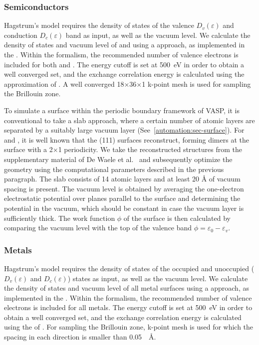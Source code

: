 \begin{refsection}
\subsubsection{Semiconductors} \label{appendix:sec-semiconductors} 

Hagstrum's model requires the density of states of the valence 
$D_v(\varepsilon)$ and conduction $D_c(\varepsilon)$ band as input, as well as 
the vacuum level. We calculate the density of states and vacuum level of 
 and  using a  approach, as implemented in 
the . Within the  formalism, the recommended number of 
valence electrons is included for both  and . The energy cutoff 
is set at 500~\si{\electronvolt} in order to obtain a well converged 
 set, and the exchange correlation energy is calculated 
using the  approximation of . A well converged 
18$\times$36$\times$1  k-point mesh is used for sampling the 
Brillouin zone.
  
To simulate a surface within the periodic boundary framework of \gls{VASP}, it is 
conventional to take a slab approach, where a certain number of atomic layers 
are separated by a suitably large vacuum layer 
(See~\ref{automation:sec-surface}). For  and , it is 
well known that the (111) surfaces reconstruct, forming dimers at the surface 
with a 2$\times$1 periodicity. We take the reconstructed structures from the 
supplementary material of De Waele et al.~\cite{DeWaele2016} and subsequently 
optimize the geometry using the computational parameters described in the 
previous paragraph. The slab consists of 14 atomic layers and at least 20 
\si{\angstrom} of vacuum spacing is present. The vacuum level is obtained by 
averaging the one-electron electrostatic potential over planes parallel to the 
surface and determining the potential in the vacuum, which should be constant 
in case the vacuum layer is sufficiently thick. The work function $\phi$ of 
the surface is then calculated by comparing the vacuum level with the top of 
the valence band $\phi = \varepsilon_0 - \varepsilon_v$.

\subsubsection{Metals}  \label{appendix:sec-metals} 

Hagstrum's model requires the density of states of the occupied and unoccupied 
($D_v(\varepsilon)$ and $D_c(\varepsilon)$) states as input, as well as 
the vacuum level. We calculate the density of states and vacuum level of 
all metal surfaces using a  approach, as implemented in the 
. Within the  formalism, the recommended number of valence 
electrons is included for all metals. The energy cutoff is set at 
500~\si{\electronvolt} in order to obtain a well converged  
set, and the exchange correlation energy is calculated using the  
of . For sampling the Brillouin zone,  k-point mesh is used 
for which the spacing in each direction is smaller than 0.05~\si{\per\angstrom}.


\end{refsection}
